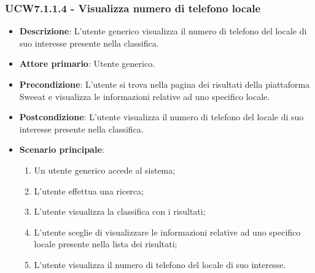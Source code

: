 \subsubsection{UCW7.1.1.4 - Visualizza numero di telefono locale}
\begin{itemize}
	\item \textbf{Descrizione}: L'utente generico visualizza il numero di telefono del locale di suo interesse presente nella classifica.
    \item \textbf{Attore primario}: Utente generico.
    \item \textbf{Precondizione}: L’utente si trova nella pagina dei risultati della piattaforma Sweeat e visualizza le informazioni relative ad uno specifico locale.
    \item \textbf{Postcondizione}: L’utente visualizza il numero di telefono del locale di suo interesse presente nella classifica.
    \item \textbf{Scenario principale}: 
    \begin{enumerate}
        \item Un utente generico accede al sistema;
        \item L’utente effettua una ricerca;
        \item L'utente visualizza la classifica con i risultati;
        \item L'utente sceglie di visualizzare le informazioni relative ad uno specifico locale presente nella lista dei risultati;
        \item L'utente visualizza il numero di telefono del locale di suo interesse.
    \end{enumerate}
\end{itemize}

